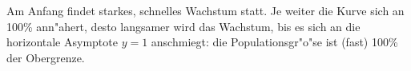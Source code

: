 \documentclass[fleqn,12pt]{scrartcl}
\begin{document}
\begin{enumerate}
		Am Anfang findet starkes, schnelles Wachstum statt. Je weiter die Kurve sich an 100\% ann"ahert, desto langsamer wird das Wachstum, bis es sich an die horizontale Asymptote $y=1$ anschmiegt: die Populationsgr"o"se ist (fast) 100\% der Obergrenze.
\end{enumerate}
\end{document}
